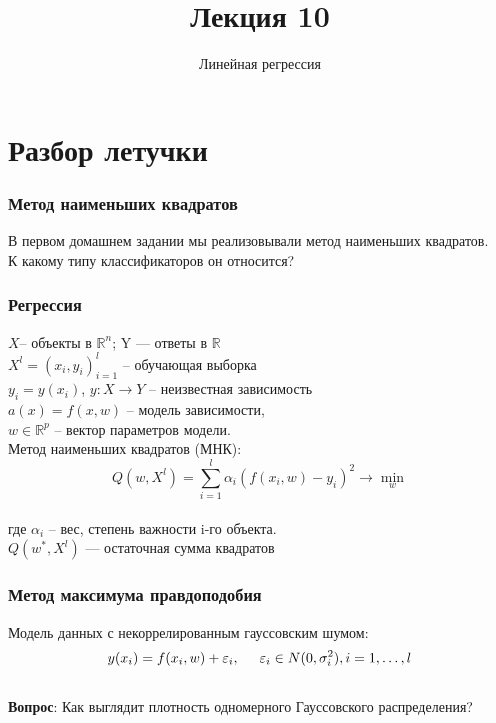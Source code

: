 \documentclass[10pt]{beamer}
\title{Лекция 10}
\subtitle{Линейная регрессия}
\begin{document}
	

\section{Разбор летучки}

\frame{\titlepage}

\begin{frame}\frametitle{Метод наименьших квадратов}
В первом домашнем задании мы реализовывали метод наименьших квадратов.\\
К какому типу классификаторов он относится?
\end{frame}

\begin{frame}\frametitle{Регрессия}
$X$-- объекты в $\mathbb{R}^n$; Y — ответы в $\mathbb{R}$\\
$X^l = (x_i, y_i)_{i=1}^l$ -- обучающая выборка\\
$y_i = y(x_i)$,  $y : X \rightarrow Y$ -- неизвестная зависимость\\
\vspace{5mm}
$a(x) = f (x, w)$ -- модель зависимости,\\
$w \in \mathbb{R}^p$ -- вектор параметров модели.\\
\vspace{5mm}
Метод наименьших квадратов (МНК):\\
$$Q(w,X^l) = \sum\limits_{i=1}^l \alpha_i (f (x_i, w) - y_i)^2 \rightarrow \min\limits_{w}$$\\
где $\alpha_i$ -- вес, степень важности i-го объекта.\\
$Q(w^*,X^l)$ — остаточная сумма квадратов

\end{frame}

\begin{frame}\frametitle{Метод максимума правдоподобия}
Модель данных с некоррелированным гауссовским шумом:\\
$$y(x_i) = f (x_i, w) + \varepsilon_i, \hspace{5mm} \varepsilon_i \in N (0, \sigma_i^2), i = 1, \dots, l$$\\
\vspace{5mm}
\textbf{Вопрос}: Как выглядит плотность одномерного Гауссовского распределения?
\end{frame}
\end{document}
